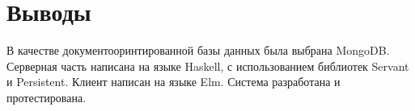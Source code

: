 \begin{figure}[ht!]
\end{figure}

\clearpage
\section{Выводы}
В качестве документооринтированной базы данных была выбрана MongoDB. Серверная часть написана на языке Haskell, с использованием библиотек Servant и Persistent. Клиент написан на языке Elm. Система разработана и протестирована.